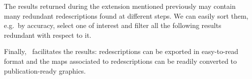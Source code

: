 \label{sec:filt-redund-redescr}
The results returned during the extension
mentioned previously may contain many redundant redescriptions found
at different steps. We can easily sort them, e.g.\ by accuracy, select
one of interest and filter all the following results redundant with respect to it.

\label{sec:sharing-results}
Finally, \Siren\ facilitates  the results:
redescriptions can be exported in easy-to-read format and the
maps associated to redescriptions can be readily converted to
publication-ready graphics. 



